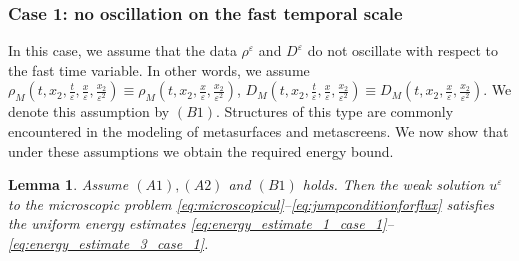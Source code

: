\documentclass[11pt]{article}
\newtheorem{lemma}{Lemma}
\def\es{\varepsilon}
\def\omm{\Omega_M^\varepsilon}
\def\p{\partial}
\begin{document}
 \subsubsection{Case 1: no oscillation on the fast temporal scale}
 In this case, we assume that the data $\rho^\es$ and $D^\es$ do not oscillate with respect to the fast time variable. In other words, we assume $\rho_M\left(t,x_2,\frac{t}{\es},\frac{x}{\es},\frac{x_2}{\es^2}\right)\equiv \rho_M\left(t,x_2,\frac{x}{\es},\frac{x_2}{\es^2}\right)$, $D_M\left(t,x_2,\frac{t}{\es},\frac{x}{\es},\frac{x_2}{\es^2}\right)\equiv D_M\left(t,x_2,\frac{x}{\es},\frac{x_2}{\es^2}\right)$.
 We denote this assumption by $(B1)$. Structures of this type are commonly encountered in the modeling of metasurfaces and metascreens.  We now show that under these assumptions we obtain the required energy bound.
	\begin{lemma}\label{lemma:energy_estimate_for_case_1}
	Assume  $(A1),(A2)$ and $(B1)$ holds. Then the weak solution $u^\es$ to the microscopic problem \eqref{eq:microscopicul}--\eqref{eq:jumpconditionforflux} satisfies the uniform energy estimates
    \eqref{eq:energy_estimate_1_case_1}--\eqref{eq:energy_estimate_3_case_1}.
	\end{lemma}
\end{document}
